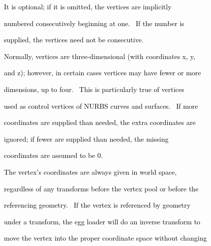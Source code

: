 \documentclass[a4paper]{article}
\newcommand\textstyleOOoComputerKeyWord[1]{\textrm{\textcolor[rgb]{0.0,0.0,0.5019608}{#1}}}
\begin{document}
{\color{black}
\textstyleOOoComputerKeyWord{\textcolor{black}{\ \ \ \ It is optional; if it is omitted, the vertices are implicitly}}}

{\color{black}
\textstyleOOoComputerKeyWord{\textcolor{black}{\ \ \ \ numbered consecutively beginning at one. \ If the number is}}}

{\color{black}
\textstyleOOoComputerKeyWord{\textcolor{black}{\ \ \ \ supplied, the vertices need not be consecutive.}}}


\bigskip

{\color{black}
\textstyleOOoComputerKeyWord{\textcolor{black}{\ \ \ \ Normally, vertices are three-dimensional (with coordinates x,
y,}}}

{\color{black}
\textstyleOOoComputerKeyWord{\textcolor{black}{\ \ \ \ and z); however, in certain cases vertices may have fewer or
more}}}

\clearpage
\bigskip

{\color{black}
\textstyleOOoComputerKeyWord{\textcolor{black}{\ \ \ \ dimensions, up to four. \ This is particularly true of
vertices}}}

{\color{black}
\textstyleOOoComputerKeyWord{\textcolor{black}{\ \ \ \ used as control vertices of NURBS curves and surfaces. \ If
more}}}

{\color{black}
\textstyleOOoComputerKeyWord{\textcolor{black}{\ \ \ \ coordinates are supplied than needed, the extra coordinates
are}}}

{\color{black}
\textstyleOOoComputerKeyWord{\textcolor{black}{\ \ \ \ ignored; if fewer are supplied than needed, the missing}}}

{\color{black}
\textstyleOOoComputerKeyWord{\textcolor{black}{\ \ \ \ coordinates are assumed to be 0.}}}


\bigskip

{\color{black}
\textstyleOOoComputerKeyWord{\textcolor{black}{\ \ \ \ The vertex's coordinates are always given in world space,}}}

{\color{black}
\textstyleOOoComputerKeyWord{\textcolor{black}{\ \ \ \ regardless of any transforms before the vertex pool or before
the}}}

{\color{black}
\textstyleOOoComputerKeyWord{\textcolor{black}{\ \ \ \ referencing geometry. \ If the vertex is referenced by
geometry}}}

{\color{black}
\textstyleOOoComputerKeyWord{\textcolor{black}{\ \ \ \ under a transform, the egg loader will do an inverse transform
to}}}

{\color{black}
\textstyleOOoComputerKeyWord{\textcolor{black}{\ \ \ \ move the vertex into the proper coordinate space without
changing}}}
\end{document}
